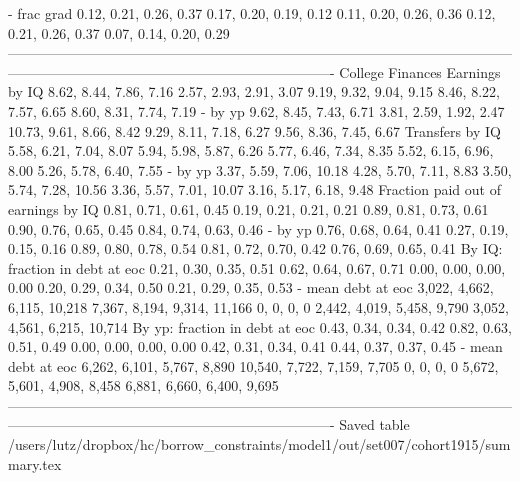                            - frac grad       0.12, 0.21, 0.26, 0.37       0.17, 0.20, 0.19, 0.12   0.11, 0.20, 0.26, 0.36      0.12, 0.21, 0.26, 0.37       0.07, 0.14, 0.20, 0.29
----------------------------------------------------------------------------------------------------------------------------------------------------------------------------------
                      College Finances                                                                                                                                            
                        Earnings by IQ       8.62, 8.44, 7.86, 7.16       2.57, 2.93, 2.91, 3.07   9.19, 9.32, 9.04, 9.15      8.46, 8.22, 7.57, 6.65       8.60, 8.31, 7.74, 7.19
                               - by yp       9.62, 8.45, 7.43, 6.71       3.81, 2.59, 1.92, 2.47  10.73, 9.61, 8.66, 8.42      9.29, 8.11, 7.18, 6.27       9.56, 8.36, 7.45, 6.67
                       Transfers by IQ       5.58, 6.21, 7.04, 8.07       5.94, 5.98, 5.87, 6.26   5.77, 6.46, 7.34, 8.35      5.52, 6.15, 6.96, 8.00       5.26, 5.78, 6.40, 7.55
                               - by yp      3.37, 5.59, 7.06, 10.18       4.28, 5.70, 7.11, 8.83  3.50, 5.74, 7.28, 10.56     3.36, 5.57, 7.01, 10.07       3.16, 5.17, 6.18, 9.48
   Fraction paid out of earnings by IQ       0.81, 0.71, 0.61, 0.45       0.19, 0.21, 0.21, 0.21   0.89, 0.81, 0.73, 0.61      0.90, 0.76, 0.65, 0.45       0.84, 0.74, 0.63, 0.46
                               - by yp       0.76, 0.68, 0.64, 0.41       0.27, 0.19, 0.15, 0.16   0.89, 0.80, 0.78, 0.54      0.81, 0.72, 0.70, 0.42       0.76, 0.69, 0.65, 0.41
        By IQ: fraction in debt at eoc       0.21, 0.30, 0.35, 0.51       0.62, 0.64, 0.67, 0.71   0.00, 0.00, 0.00, 0.00      0.20, 0.29, 0.34, 0.50       0.21, 0.29, 0.35, 0.53
                    - mean debt at eoc  3,022, 4,662, 6,115, 10,218  7,367, 8,194, 9,314, 11,166               0, 0, 0, 0  2,442, 4,019, 5,458, 9,790  3,052, 4,561, 6,215, 10,714
        By yp: fraction in debt at eoc       0.43, 0.34, 0.34, 0.42       0.82, 0.63, 0.51, 0.49   0.00, 0.00, 0.00, 0.00      0.42, 0.31, 0.34, 0.41       0.44, 0.37, 0.37, 0.45
                    - mean debt at eoc   6,262, 6,101, 5,767, 8,890  10,540, 7,722, 7,159, 7,705               0, 0, 0, 0  5,672, 5,601, 4,908, 8,458   6,881, 6,660, 6,400, 9,695
----------------------------------------------------------------------------------------------------------------------------------------------------------------------------------
Saved table  /users/lutz/dropbox/hc/borrow_constraints/model1/out/set007/cohort1915/summary.tex 
